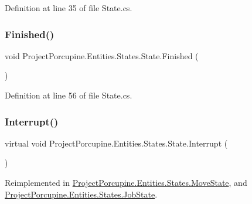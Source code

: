 Definition at line 35 of file State.\+cs.

\mbox{\label{class_project_porcupine_1_1_entities_1_1_states_1_1_state_a2a2356d04d252973b4631b11531e6218}} 
\subsubsection{\texorpdfstring{Finished()}{Finished()}}
{\footnotesize\ttfamily void Project\+Porcupine.\+Entities.\+States.\+State.\+Finished (\begin{DoxyParamCaption}{ }\end{DoxyParamCaption})\hspace{0.3cm}{\ttfamily [protected]}}



Definition at line 56 of file State.\+cs.

\mbox{\label{class_project_porcupine_1_1_entities_1_1_states_1_1_state_a82fba061891136da0cc359c54337d0be}} 
\subsubsection{\texorpdfstring{Interrupt()}{Interrupt()}}
{\footnotesize\ttfamily virtual void Project\+Porcupine.\+Entities.\+States.\+State.\+Interrupt (\begin{DoxyParamCaption}{ }\end{DoxyParamCaption})\hspace{0.3cm}{\ttfamily [virtual]}}



Reimplemented in \hyperlink{class_project_porcupine_1_1_entities_1_1_states_1_1_move_state_a875221e1914193146fc96d1fc5a3ac59}{Project\+Porcupine.\+Entities.\+States.\+Move\+State}, and \hyperlink{class_project_porcupine_1_1_entities_1_1_states_1_1_job_state_a538f6ddf6987df25b399324840ae3354}{Project\+Porcupine.\+Entities.\+States.\+Job\+State}.



